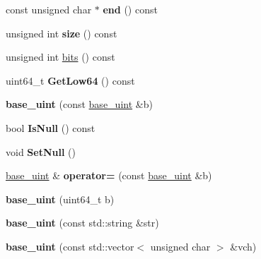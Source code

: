 \begin{DoxyCompactItemize}
\mbox{\label{classbase__uint_a205d89f7614095c6c8badb1e3dfa0f0f}} 
const unsigned char $\ast$ {\bfseries end} () const
\item 
\mbox{\label{classbase__uint_a1f49b034e686269601ea89b0319b8004}} 
unsigned int {\bfseries size} () const
\item 
unsigned int \mbox{\hyperlink{classbase__uint_afe1eacc0b592cf184ac8ee0446997fbe}{bits}} () const
\item 
\mbox{\label{classbase__uint_ad8dbf3216dd15a64f1598344ad7a71ea}} 
uint64\+\_\+t {\bfseries Get\+Low64} () const
\item 
\mbox{\label{classbase__uint_a5d4e4c28c82c3a12b3689860081579c1}} 
{\bfseries base\+\_\+uint} (const \mbox{\hyperlink{classbase__uint}{base\+\_\+uint}} \&b)
\item 
\mbox{\label{classbase__uint_a5b67cea01e9219160fe251053adc7cc7}} 
bool {\bfseries Is\+Null} () const
\item 
\mbox{\label{classbase__uint_ab7f832a0d48a7da00296497c820ae775}} 
void {\bfseries Set\+Null} ()
\item 
\mbox{\label{classbase__uint_a0425a3c4d342b6fc9a68b1766cee9ede}} 
\mbox{\hyperlink{classbase__uint}{base\+\_\+uint}} \& {\bfseries operator=} (const \mbox{\hyperlink{classbase__uint}{base\+\_\+uint}} \&b)
\item 
\mbox{\label{classbase__uint_a217f9750f0ca9cdeefffb7bb1f1952d6}} 
{\bfseries base\+\_\+uint} (uint64\+\_\+t b)
\item 
\mbox{\label{classbase__uint_aa1ebaba47302da3e120879d186355736}} 
{\bfseries base\+\_\+uint} (const std\+::string \&str)
\item 
\mbox{\label{classbase__uint_ab6dd7d7921572078a4733e4acc22b2a9}} 
{\bfseries base\+\_\+uint} (const std\+::vector$<$ unsigned char $>$ \&vch)
\item 
\mbox{\label{classbase__uint_afbcdb1cf849d37272b4e7d4fabf1192b}} 

\end{DoxyCompactItemize}
